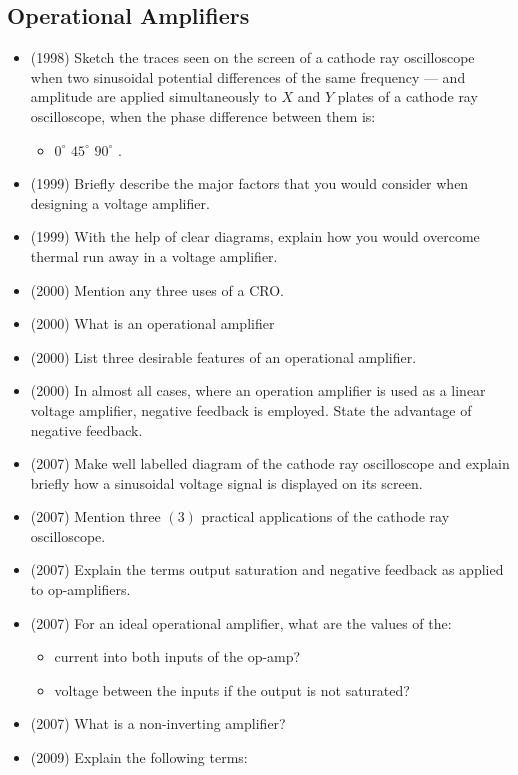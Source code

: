 \documentclass{article}
\begin{document}
\subsection{Operational Amplifiers}
\begin{itemize}
\item (1998)  Sketch the traces seen on the screen of a cathode ray oscilloscope when two sinusoidal potential differences of the same frequency — and amplitude are applied simultaneously to $ X$ and $ Y$ plates of  a cathode ray oscilloscope, when the phase difference between them is:
 \begin{itemize}
\item $ 0^{\circ}$ $ 45^{\circ}$ $ 90^{\circ}$ .
\end{itemize}
\item (1999)  Briefly describe the major factors that you would consider when designing a voltage amplifier.
\item (1999)  With the help of clear diagrams, explain how you would overcome thermal run away in a voltage amplifier.
\item (2000)  Mention any three uses of a CRO.
\item (2000)  What is an operational amplifier 
\item (2000)  List three desirable features of an operational amplifier.
\item (2000)  In almost all cases, where an operation amplifier is used as a linear voltage amplifier, negative feedback is employed. State the advantage of negative feedback.
\item (2007)  Make well labelled diagram of the cathode ray oscilloscope and explain briefly how a sinusoidal voltage signal is displayed on its screen.
\item (2007)  Mention three $ (3)$ practical applications of the cathode ray oscilloscope.
\item (2007)  Explain the terms output saturation and negative feedback as applied to op-amplifiers. 
\item (2007)  For an ideal operational amplifier, what are the values of the:
 \begin{itemize}
\item current into both inputs of the op-amp? 
\item voltage between the inputs if the output is not saturated? 
\end{itemize}
\item (2007)  What is a non-inverting amplifier? 
\item (2009)  Explain the following terms:

\end{itemize}
\end{document}
